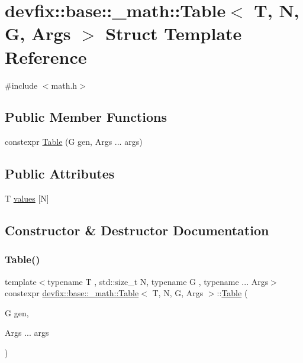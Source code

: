 \hypertarget{structdevfix_1_1base_1_1__math_1_1Table}{}\section{devfix\+:\+:base\+:\+:\+\_\+math\+:\+:Table$<$ T, N, G, Args $>$ Struct Template Reference}
\label{structdevfix_1_1base_1_1__math_1_1Table}


{\ttfamily \#include $<$math.\+h$>$}

\subsection*{Public Member Functions}
\begin{DoxyCompactItemize}
\item 
constexpr \hyperlink{structdevfix_1_1base_1_1__math_1_1Table_acc5b398c45b9dcd7846f5228611a43b9}{Table} (G gen, Args ... args)
\end{DoxyCompactItemize}
\subsection*{Public Attributes}
\begin{DoxyCompactItemize}
\item 
T \hyperlink{structdevfix_1_1base_1_1__math_1_1Table_a3352fdb7ab931816a7d131b643099c97}{values} \mbox{[}N\mbox{]}
\end{DoxyCompactItemize}


\subsection{Constructor \& Destructor Documentation}
\mbox{\label{structdevfix_1_1base_1_1__math_1_1Table_acc5b398c45b9dcd7846f5228611a43b9}} 
\subsubsection{\texorpdfstring{Table()}{Table()}}
{\footnotesize\ttfamily template$<$typename T , std\+::size\+\_\+t N, typename G , typename ... Args$>$ \\
constexpr \hyperlink{structdevfix_1_1base_1_1__math_1_1Table}{devfix\+::base\+::\+\_\+math\+::\+Table}$<$ T, N, G, Args $>$\+::\hyperlink{structdevfix_1_1base_1_1__math_1_1Table}{Table} (\begin{DoxyParamCaption}\item[{G}]{gen,  }\item[{Args ...}]{args }\end{DoxyParamCaption})\hspace{0.3cm}{\ttfamily [inline]}}



